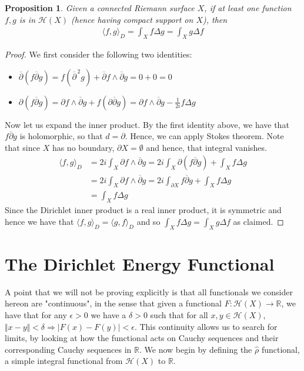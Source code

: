 \documentclass[11pt]{report}
\newtheorem{prop}[thm]{Proposition}
\theoremstyle{definition}
\begin{document}
\begin{prop}\label{InnerLaplacian}
  Given a connected Riemann surface $X$, if at least one function $f,g$ is in $\mathcal{H}(X)$ (hence having compact support on $X$), then 
  \begin{align*}
    \langle f, g \rangle_D = \int_X f \Delta g = \int_X g \Delta f
  \end{align*}
\end{prop}
\begin{proof}
  We first consider the following two identities:
  \begin{itemize}
    \item $\overline{\partial}(f\overline{\partial}g) = f (\overline{\partial}^{\, 2} g) + \overline{\partial}f \wedge \overline{\partial}g = 0 + 0 = 0$
    \item $\partial(f\overline{\partial}g)=\partial f \wedge \overline{\partial}g + f(\partial\overline{\partial}g)=\partial f \wedge \overline{\partial}g - \frac{1}{2i}f\Delta g$
  \end{itemize}
  Now let us expand the inner product. By the first identity above, we have that $f\overline{\partial}g$ is holomorphic, so that $d = \partial$. Hence, we can apply Stokes theorem. Note that since $X$ has no boundary, $\partial X = \emptyset$ and hence, that integral vanishes.
  \begin{align*}
    \langle f, g \rangle_D &= 2i\int_X \partial f \wedge \overline{\partial}g = 2i\int_X \partial(f\overline{\partial}g)+\int_X f\Delta g \\
    &= 2i\int_X \partial f \wedge \overline{\partial}g = 2i\int_{\partial X} f\overline{\partial}g + \int_X f\Delta g \\
    &= \int_X f\Delta g
  \end{align*}
  Since the Dirichlet inner product is a real inner product, it is symmetric and hence we have that $\langle f, g \rangle_D = \langle g, f \rangle_D $ and so $\int_X f\Delta g = \int_X g \Delta f$ as claimed.
\end{proof}

\section{The Dirichlet Energy Functional}

A point that we will not be proving explicitly is that all functionals we consider hereon are "continuous", in the sense that given a functional $F:\mathcal{H}(X) \rightarrow \mathbb{R}$, we have that for any $\epsilon > 0$ we have a $\delta > 0$ such that for all $x,y \in \mathcal{H}(X)$, $\Vert x - y \Vert < \delta \Rightarrow |F(x) - F(y)| < \epsilon$. This continuity allows us to search for limits, by looking at how the functional acts on Cauchy sequences and their corresponding Cauchy sequences in $\mathbb{R}$.
We now begin by defining the $\hat{\rho}$ functional, a simple integral functional from $\mathcal{H}(X)$ to $\mathbb{R}$. 
\end{document}
